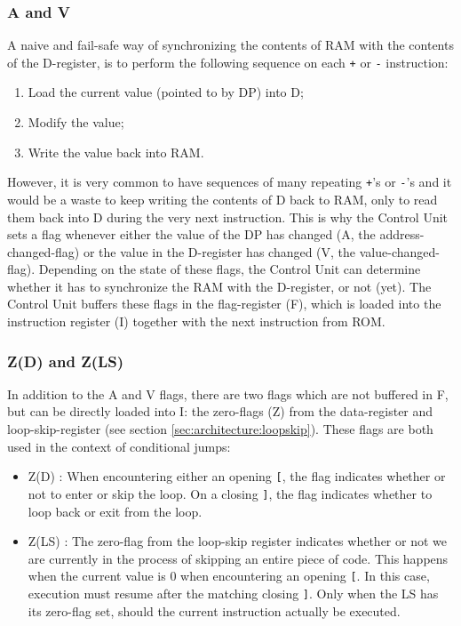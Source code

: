 \subsubsection{A and V}
A naive and fail-safe way of synchronizing the contents of RAM with the contents of the D-register, is to perform the following sequence on each \texttt{+} or \texttt{-} instruction:
\begin{enumerate}
\item Load the current value (pointed to by DP) into D;
\item Modify the value;
\item Write the value back into RAM.
\end{enumerate}
However, it is very common to have sequences of many repeating \texttt{+}'s or \texttt{-}'s and it would be a waste to keep writing the contents of D back to RAM, only to read them back into D during the very next instruction. This is why the Control Unit sets a flag whenever either the value of the DP has changed (A, the address-changed-flag) or the value in the D-register has changed (V, the value-changed-flag). Depending on the state of these flags, the Control Unit can determine whether it has to synchronize the RAM with the D-register, or not (yet). The Control Unit buffers these flags in the flag-register (F), which is loaded into the instruction register (I) together with the next instruction from ROM.

\subsubsection{Z(D) and Z(LS)}
In addition to the A and V flags, there are two flags which are not buffered in F, but can be directly loaded into I: the zero-flags (Z) from the data-register and loop-skip-register (see section \ref{sec:architecture:loopskip}). These flags are both used in the context of conditional jumps:
\begin{itemize}
\item Z(D) : When encountering either an opening \texttt{[}, the flag indicates whether or not to enter or skip the loop. On a closing \texttt{]}, the flag indicates whether to loop back or exit from the loop.
\item Z(LS) : The zero-flag from the loop-skip register indicates whether or not we are currently in the process of skipping an entire piece of code. This happens when the current value is 0 when encountering an opening \texttt{[}. In this case, execution must resume after the matching closing \texttt{]}. Only when the LS has its zero-flag set, should the current instruction actually be executed.
\end{itemize}

